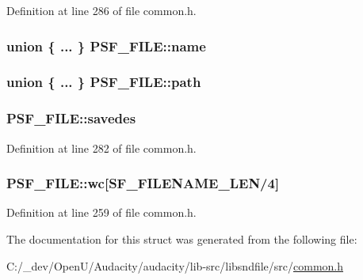 Definition at line 286 of file common.\+h.

\subsubsection[{\texorpdfstring{name}{name}}]{\setlength{\rightskip}{0pt plus 5cm}union \{ ... \}   P\+S\+F\+\_\+\+F\+I\+L\+E\+::name}\hypertarget{struct_p_s_f___f_i_l_e_a211b423500bd35c5d2bc40215a2853b5}{}\label{struct_p_s_f___f_i_l_e_a211b423500bd35c5d2bc40215a2853b5}
\subsubsection[{\texorpdfstring{path}{path}}]{\setlength{\rightskip}{0pt plus 5cm}union \{ ... \}   P\+S\+F\+\_\+\+F\+I\+L\+E\+::path}\hypertarget{struct_p_s_f___f_i_l_e_ae23a10ddaa8dcb2be3c278d9a639bfcd}{}\label{struct_p_s_f___f_i_l_e_ae23a10ddaa8dcb2be3c278d9a639bfcd}
\subsubsection[{\texorpdfstring{savedes}{savedes}}]{ P\+S\+F\+\_\+\+F\+I\+L\+E\+::savedes}\hypertarget{struct_p_s_f___f_i_l_e_a53eecd0ee02c5d803105f075d79e4133}{}\label{struct_p_s_f___f_i_l_e_a53eecd0ee02c5d803105f075d79e4133}


Definition at line 282 of file common.\+h.

\subsubsection[{\texorpdfstring{wc}{wc}}]{ P\+S\+F\+\_\+\+F\+I\+L\+E\+::wc\mbox{[}{\bf S\+F\+\_\+\+F\+I\+L\+E\+N\+A\+M\+E\+\_\+\+L\+EN}/4\mbox{]}}\hypertarget{struct_p_s_f___f_i_l_e_a9ad5bb127092a92ea3556796dc56c4e2}{}\label{struct_p_s_f___f_i_l_e_a9ad5bb127092a92ea3556796dc56c4e2}


Definition at line 259 of file common.\+h.



The documentation for this struct was generated from the following file\+:\begin{DoxyCompactItemize}
\item 
C\+:/\+\_\+dev/\+Open\+U/\+Audacity/audacity/lib-\/src/libsndfile/src/\hyperlink{libsndfile_2src_2common_8h}{common.\+h}\end{DoxyCompactItemize}

